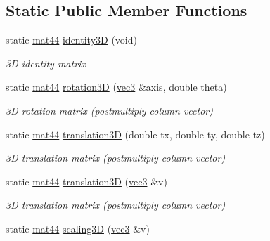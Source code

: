 \subsection*{\-Static \-Public \-Member \-Functions}
\begin{DoxyCompactItemize}
\item 
\hypertarget{classutil_1_1math_1_1mat44_a431fbe42a779437f9c58081860bfc350}{static \hyperlink{classutil_1_1math_1_1mat44}{mat44} \hyperlink{classutil_1_1math_1_1mat44_a431fbe42a779437f9c58081860bfc350}{identity3\-D} (void)}\label{classutil_1_1math_1_1mat44_a431fbe42a779437f9c58081860bfc350}

\begin{DoxyCompactList}\small\item\em 3\-D identity matrix \end{DoxyCompactList}\item 
\hypertarget{classutil_1_1math_1_1mat44_acae3b35098a2036170cee2b2bde29214}{static \hyperlink{classutil_1_1math_1_1mat44}{mat44} \hyperlink{classutil_1_1math_1_1mat44_acae3b35098a2036170cee2b2bde29214}{rotation3\-D} (\hyperlink{classutil_1_1math_1_1vec3}{vec3} \&axis, double theta)}\label{classutil_1_1math_1_1mat44_acae3b35098a2036170cee2b2bde29214}

\begin{DoxyCompactList}\small\item\em 3\-D rotation matrix (postmultiply column vector) \end{DoxyCompactList}\item 
\hypertarget{classutil_1_1math_1_1mat44_a7b37a6b940dc5a21134184f6a4d955b8}{static \hyperlink{classutil_1_1math_1_1mat44}{mat44} \hyperlink{classutil_1_1math_1_1mat44_a7b37a6b940dc5a21134184f6a4d955b8}{translation3\-D} (double tx, double ty, double tz)}\label{classutil_1_1math_1_1mat44_a7b37a6b940dc5a21134184f6a4d955b8}

\begin{DoxyCompactList}\small\item\em 3\-D translation matrix (postmultiply column vector) \end{DoxyCompactList}\item 
\hypertarget{classutil_1_1math_1_1mat44_a732905b1b9b3a2a0318dc5b3e08182a6}{static \hyperlink{classutil_1_1math_1_1mat44}{mat44} \hyperlink{classutil_1_1math_1_1mat44_a732905b1b9b3a2a0318dc5b3e08182a6}{translation3\-D} (\hyperlink{classutil_1_1math_1_1vec3}{vec3} \&v)}\label{classutil_1_1math_1_1mat44_a732905b1b9b3a2a0318dc5b3e08182a6}

\begin{DoxyCompactList}\small\item\em 3\-D translation matrix (postmultiply column vector) \end{DoxyCompactList}\item 
\hypertarget{classutil_1_1math_1_1mat44_aa0c227bb97d6909a65f498af987d72c7}{static \hyperlink{classutil_1_1math_1_1mat44}{mat44} \hyperlink{classutil_1_1math_1_1mat44_aa0c227bb97d6909a65f498af987d72c7}{scaling3\-D} (\hyperlink{classutil_1_1math_1_1vec3}{vec3} \&v)}\label{classutil_1_1math_1_1mat44_aa0c227bb97d6909a65f498af987d72c7}


\end{DoxyCompactItemize}
